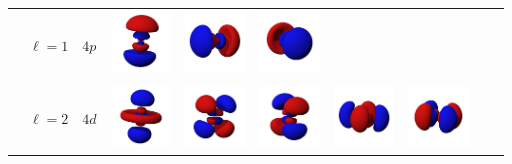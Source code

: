 \begin{landscape}
\begin{xltabular}{\linewidth}{C C C c c c c c c c}
\addlinespace

&  &  & 
\includegraphics[width=1.6cm]{tableau_geometrie_orbitale_modelisation/P4z.png} 
&
\includegraphics[width=1.6cm]{tableau_geometrie_orbitale_modelisation/P4x.png}  
&
\includegraphics[width=1.6cm]{tableau_geometrie_orbitale_modelisation/P4y.png} 
& & & & \\

& & &  &  &  & & & &  \\ %

\addlinespace

&  &  & 
\includegraphics[width=1.6cm]{tableau_geometrie_orbitale_modelisation/D4z2.png} 
&
\includegraphics[width=1.6cm]{tableau_geometrie_orbitale_modelisation/D4xz.png}  
&
\includegraphics[width=1.6cm]{tableau_geometrie_orbitale_modelisation/D4yz.png} 
& 
\includegraphics[width=1.6cm]{tableau_geometrie_orbitale_modelisation/D4xy.png} 
&
\includegraphics[width=1.6cm]{tableau_geometrie_orbitale_modelisation/D4x2-y2.png} 
& & \\


\end{xltabular}
\end{landscape}
